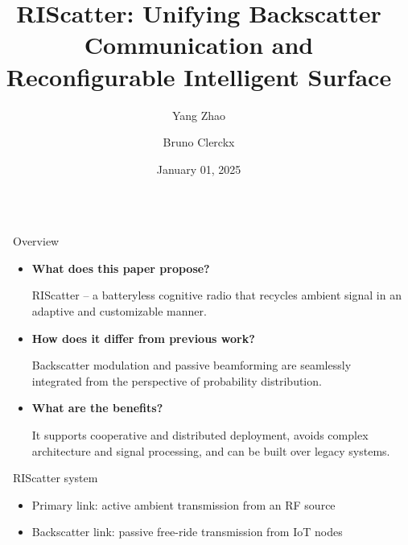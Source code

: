 \documentclass[final,xcolor={table}]{beamer}
\title{RIScatter: Unifying Backscatter Communication and Reconfigurable Intelligent Surface}
\author{Yang Zhao \and Bruno Clerckx}
\date{January 01, 2025}
\newlength{\sepwidth}
\newlength{\colwidth}
\newcommand{\separatorcolumn}{\begin{column}{\sepwidth}\end{column}}
\begin{document}
\begin{frame}[t]
	\begin{columns}[t]
		\separatorcolumn

		\begin{column}{\colwidth}
			\begin{block}{Overview}
				\begin{itemize}\setlength\itemsep{20pt}
					\item \textbf{What does this paper propose?}

					RIScatter -- a batteryless cognitive radio that recycles ambient signal in an adaptive and customizable manner.
					\item \textbf{How does it differ from previous work?}

					Backscatter modulation and passive beamforming are seamlessly integrated from the perspective of probability distribution.
					\item \textbf{What are the benefits?}

					It supports cooperative and distributed deployment, avoids complex architecture and signal processing, and can be built over legacy systems.
				\end{itemize}
			\end{block}

			\begin{block}{RIScatter system}
				\begin{figure}[!t]
					\centering
					\resizebox{0.5\linewidth}{!}{
						
					}
					\label{fg:riscatter}
				\end{figure}
				\begin{itemize}\setlength\itemsep{20pt}
					\item {\color{blue}Primary link:} active ambient transmission from an RF source
					\item {\color{red}Backscatter link:} passive free-ride transmission from IoT nodes
				\end{itemize}
			\end{block}


\end{column}
\end{columns}
\end{frame}
\end{document}
